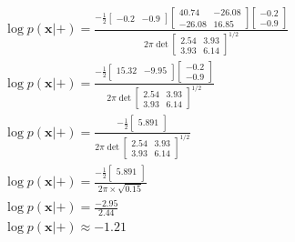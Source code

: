 \documentclass[leqno]{article}
\begin{document}
\begin{gather*}
\begin{split}
&\log p(\textbf{x}|+) = 
\frac{-\frac{1}{2}\begin{bmatrix}
   -0.2 & -0.9 
\end{bmatrix}\begin{bmatrix}
   40.74 & -26.08\\
   -26.08 & 16.85 
\end{bmatrix}\begin{bmatrix}
   -0.2\\
   -0.9 
\end{bmatrix}}{2\pi\det{\begin{bmatrix}
   2.54 & 3.93\\
   3.93 & 6.14 
\end{bmatrix}}^{1/2}}\\
&\log p(\textbf{x}|+) = 
\frac{-\frac{1}{2}\begin{bmatrix}
   15.32 & -9.95\\ 
\end{bmatrix}\begin{bmatrix}
   -0.2\\
   -0.9 
\end{bmatrix}}{2\pi\det{\begin{bmatrix}
   2.54 & 3.93\\
   3.93 & 6.14 
\end{bmatrix}}^{1/2}}\\
&\log p(\textbf{x}|+) = 
\frac{-\frac{1}{2}\begin{bmatrix}
   5.891\\ 
\end{bmatrix}}{2\pi\det{\begin{bmatrix}
   2.54 & 3.93\\
   3.93 & 6.14 
\end{bmatrix}}^{1/2}}\\
&\log p(\textbf{x}|+) = 
\frac{-\frac{1}{2}\begin{bmatrix}
   5.891\\ 
\end{bmatrix}}{2\pi \times \sqrt{0.15}}\\
&\log p(\textbf{x}|+) = 
\frac{-2.95}{2.44}\\
& \log p(\textbf{x}|+) \approx -1.21
\end{split}
\end{gather*}
\end{document}
